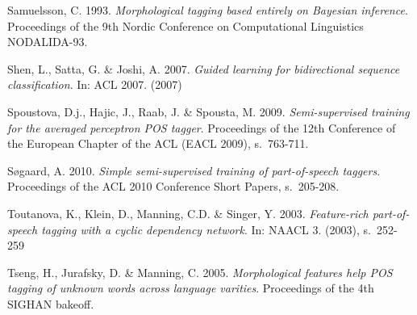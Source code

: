 \documentclass[utf8,bachelor,manualbib]{gradu3}
\begin{document}
\begin{thebibliography}{}
Samuelsson, C. 1993. \textit{Morphological tagging based entirely on Bayesian inference}. Proceedings of the 9th Nordic Conference on Computational Linguistics NODALIDA-93.

Shen, L., Satta, G. \& Joshi, A. 2007. \textit{Guided learning for bidirectional sequence classification}. In: ACL 2007. (2007)

Spoustova, D.j., Hajic, J., Raab, J. \& Spousta, M. 2009. \textit{Semi-supervised training for the averaged perceptron POS tagger}. Proceedings of the 12th Conference of the
European Chapter of the ACL (EACL 2009), s.~763-711.

Søgaard, A. 2010. \textit{Simple semi-supervised training of part-of-speech taggers}. Proceedings of the ACL 2010 Conference Short Papers, s.~205-208.

Toutanova, K., Klein, D., Manning, C.D. \& Singer, Y. 2003. \textit{Feature-rich part-of-speech tagging with a cyclic dependency network}. In: NAACL 3. (2003), s.~252-259

Tseng, H., Jurafsky, D. \& Manning, C. 2005. \textit{Morphological features help POS tagging of unknown words across language varities}. Proceedings of the 4th SIGHAN bakeoff.

\end{thebibliography}
\end{document}
